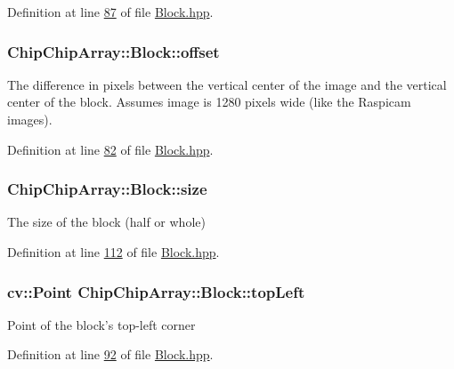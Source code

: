 Definition at line \hyperlink{Block_8hpp_source_l00087}{87} of file \hyperlink{Block_8hpp_source}{Block.\+hpp}.

\hypertarget{classChipChipArray_1_1Block_a42e2ca0775dc09b04049a2db1bc0bb4f}{
\subsubsection[{offset}]{ Chip\+Chip\+Array\+::\+Block\+::offset}}\label{classChipChipArray_1_1Block_a42e2ca0775dc09b04049a2db1bc0bb4f}
The difference in pixels between the vertical center of the image and the vertical center of the block. Assumes image is 1280 pixels wide (like the Raspicam images). 

Definition at line \hyperlink{Block_8hpp_source_l00082}{82} of file \hyperlink{Block_8hpp_source}{Block.\+hpp}.

\hypertarget{classChipChipArray_1_1Block_aebd356d7fcfe7ff11db8195e6d7f8e42}{
\subsubsection[{size}]{ Chip\+Chip\+Array\+::\+Block\+::size}}\label{classChipChipArray_1_1Block_aebd356d7fcfe7ff11db8195e6d7f8e42}
The size of the block (half or whole) 

Definition at line \hyperlink{Block_8hpp_source_l00112}{112} of file \hyperlink{Block_8hpp_source}{Block.\+hpp}.

\hypertarget{classChipChipArray_1_1Block_aeecc05025c6c8e23ff6ca09a6fbd4b4b}{
\subsubsection[{top\+Left}]{\setlength{\rightskip}{0pt plus 5cm}cv\+::\+Point Chip\+Chip\+Array\+::\+Block\+::top\+Left}}\label{classChipChipArray_1_1Block_aeecc05025c6c8e23ff6ca09a6fbd4b4b}
Point of the block's top-\/left corner 

Definition at line \hyperlink{Block_8hpp_source_l00092}{92} of file \hyperlink{Block_8hpp_source}{Block.\+hpp}.

